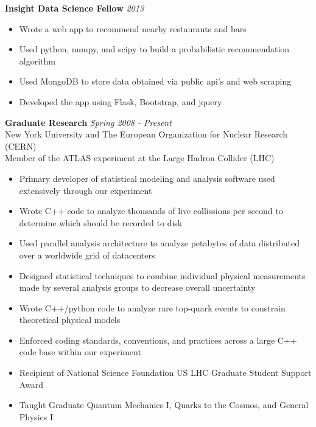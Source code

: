 \documentclass[9pt]{article}
\newenvironment{changemargin}[2]{%
  \begin{list}{}{%
    \setlength{\topsep}{0pt}%
    \setlength{\leftmargin}{#1}%
    \setlength{\rightmargin}{#2}%
    \setlength{\listparindent}{\parindent}%
    \setlength{\itemindent}{\parindent}%
    \setlength{\parsep}{\parskip}%
  }%
  \item[]}{\end{list}
}
\newenvironment{body} {
	\vspace*{-16pt}
	\begin{changemargin}{-0.25in}{-0.5in}
  }	
	{\end{changemargin}
}
\begin{document}
\begin{body}
	\vspace{14pt}
	\textbf{Insight Data Science Fellow} \hfill \emph{2013}\\
        \begin{itemize}
        \item Wrote a web app to recommend nearby restaurants and bars \\
        \item Used python, numpy, and scipy to build a probabilistic recommendation algorithm \\
        \item Used MongoDB to store data obtained via public api's and web scraping \\
        \item Developed the app using Flask, Bootstrap, and jquery \\
        \end{itemize}

        \medskip

	\textbf{Graduate Research} \hfill \emph{Spring 2008 - Present}\\
	New York University and The European Organization for Nuclear Research (CERN) \\
        Member of the ATLAS experiment at the Large Hadron Collider (LHC) \\

        \medskip

        \begin{itemize}
        \item Primary developer of statistical modeling and analysis software used extensively through our experiment
        \item Wrote C++ code to analyze thousands of live collissions per second to determine which should be recorded to disk %
        \item Used parallel analysis architecture to analyze petabytes of data distributed over a worldwide grid of datacenters %
        \item Designed statistical techniques to combine individual physical measurements made by several analysis groups to decrease overall uncertainty
        \item Wrote C++/python code to analyze rare top-quark events to constrain theoretical physical models
        \item Enforced coding standards, conventions, and practices across a large C++ code base within our experiment
        \item Recipient of National Science Foundation US LHC Graduate Student Support Award
        \item Taught Graduate Quantum Mechanics I, Quarks to the Cosmos, and General Physics I


\end{itemize}
\end{body}
\end{document}
